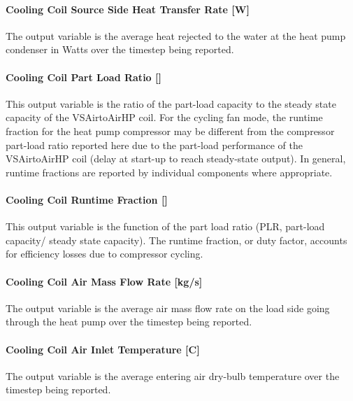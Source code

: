 \paragraph{Cooling Coil Source Side Heat Transfer Rate {[}W{]}}\label{cooling-coil-source-side-heat-transfer-rate-w}

The output variable is the average heat rejected to the water at the heat pump condenser in Watts over the timestep being reported.

\paragraph{Cooling Coil Part Load Ratio {[]}}\label{cooling-coil-part-load-ratio}

This output variable is the ratio of the part-load capacity to the steady state capacity of the VSAirtoAirHP coil. For the cycling fan mode, the runtime fraction for the heat pump compressor may be different from the compressor part-load ratio reported here due to the part-load performance of the VSAirtoAirHP coil (delay at start-up to reach steady-state output). In general, runtime fractions are reported by individual components where appropriate.

\paragraph{Cooling Coil Runtime Fraction {[]}}\label{cooling-coil-runtime-fraction-3}

This output variable is the function of the part load ratio (PLR, part-load capacity/ steady state capacity). The runtime fraction, or duty factor, accounts for efficiency losses due to compressor cycling.

\paragraph{Cooling Coil Air Mass Flow Rate {[}kg/s{]}}\label{cooling-coil-air-mass-flow-rate-kgs}

The output variable is the average air mass flow rate on the load side going through the heat pump over the timestep being reported.

\paragraph{Cooling Coil Air Inlet Temperature {[}C{]}}\label{cooling-coil-air-inlet-temperature-c}

The output variable is the average entering air dry-bulb temperature over the timestep being reported.

